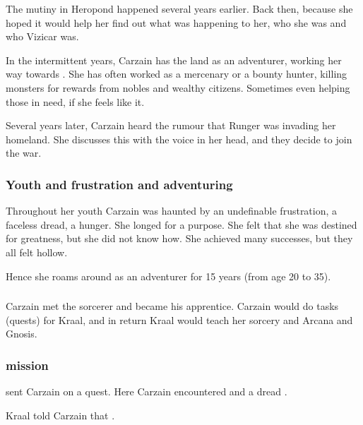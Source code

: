 The mutiny in Heropond happened several years earlier. 
Back then,  because she hoped it would help her find out what was happening to her, who she was and who Vizicar was. 

In the intermittent years, Carzain has \travelled the land as an adventurer, working her way towards \kenosis. 
She has often worked as a mercenary or a bounty hunter, killing monsters for rewards from nobles and wealthy citizens. 
Sometimes even helping those in need, if she feels like it. 

Several years later, Carzain heard the rumour that Runger was invading her homeland. 
She discusses this with the voice in her head, and they decide to join the war. 





\subsubsection{Youth and frustration and adventuring}
Throughout her youth Carzain was haunted by an undefinable frustration, a faceless dread, a hunger. 
She longed for a purpose. 
She felt that she was destined for greatness, but she did not know how.
She achieved many successes, but they all felt hollow. 

Hence she roams around as an adventurer for 15 years (from age 20 to 35). 





\subsubsection{\ZeethanKraal}
Carzain met the \caisith sorcerer  and became his apprentice.
Carzain would do tasks (quests) for Kraal, and in return Kraal would teach her sorcery and Arcana and Gnosis. 





\subsubsection{\Moongod mission}
\ZeethanKraal sent Carzain on a quest.
Here Carzain encountered  and a dread . 

Kraal told Carzain that . 

